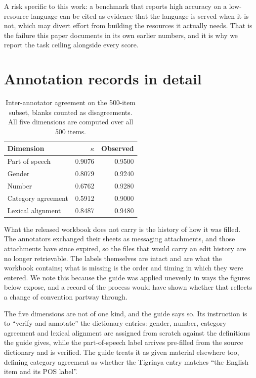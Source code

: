 \documentclass[11pt]{article}
\begin{document}
A risk specific to this work: a benchmark that reports high accuracy on a
low-resource language can be cited as evidence that the language is served
when it is not, which may divert effort from building the resources it
actually needs. That is the failure this paper documents in its own earlier
numbers, and it is why we report the task ceiling alongside every score.



\appendix

\section{Annotation records in detail}
\label{app:iaa}

\begin{table}[t]
\centering
\begin{tabular}{lrr}
\toprule
Dimension & $\kappa$ & Observed \\
\midrule
Part of speech     & 0.9076 & 0.9500 \\
Gender             & 0.8079 & 0.9240 \\
Number             & 0.6762 & 0.9280 \\
Category agreement & 0.5912 & 0.9000 \\
Lexical alignment  & 0.8487 & 0.9480 \\
\bottomrule
\end{tabular}
\caption{Inter-annotator agreement on the 500-item subset, blanks counted as
disagreements. All five dimensions are computed over all 500 items.}
\label{tab:iaa}
\end{table}

What the released workbook does not carry is the history of how it was
filled. The annotators exchanged their sheets as messaging attachments, and
those attachments have since expired, so the files that would carry an edit
history are no longer retrievable. The labels themselves are intact and are
what the workbook contains; what is missing is the order and timing in which
they were entered. We note this because the guide was applied unevenly in
ways the figures below expose, and a record of the process would have shown
whether that reflects a change of convention partway through.

The five dimensions are not of one kind, and the guide says so. Its
instruction is to ``verify and annotate'' the dictionary entries: gender,
number, category agreement and lexical alignment are assigned from scratch
against the definitions the guide gives, while the part-of-speech label
arrives pre-filled from the source dictionary and is verified. The guide
treats it as given material elsewhere too, defining category agreement as
whether the Tigrinya entry matches ``the English item and its POS label''.
\end{document}
